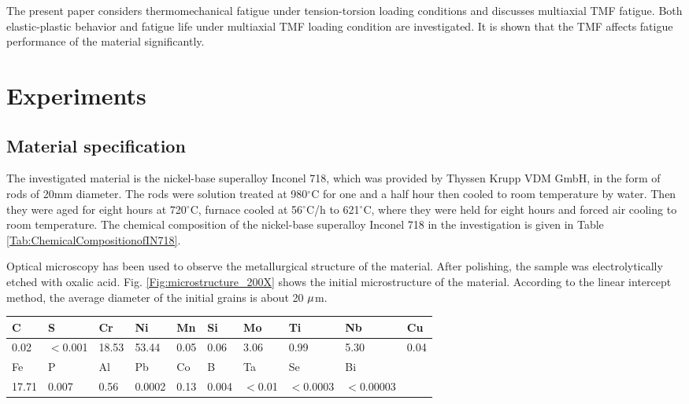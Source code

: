 \documentclass[preprint,5p,twocolumn,11pt,sort&compress]{elsarticle}
\begin{document}
The present paper considers thermomechanical fatigue under tension-torsion loading conditions and discusses multiaxial TMF fatigue. Both elastic-plastic behavior and fatigue life under multiaxial TMF loading condition are investigated. It is shown that the TMF affects fatigue performance of the material significantly.

\section{Experiments}
\subsection{Material specification}
The investigated material is the nickel-base superalloy Inconel 718, which was provided by Thyssen Krupp VDM GmbH, in the form of rods of 20mm diameter.
The rods were solution treated at 980$^{\circ}$C for one and a half hour then cooled to room temperature by water.
Then they were aged for eight hours at 720$^{\circ}$C, furnace cooled at 56$^{\circ}$C/h to 621$^{\circ}$C, where they were held for eight hours and forced air cooling to room temperature.
The chemical composition of the nickel-base superalloy Inconel 718 in the investigation is given in Table \ref{Tab:ChemicalCompositionofIN718}.

Optical microscopy has been used to observe the metallurgical structure of the material. After polishing, the sample was electrolytically etched with oxalic acid. Fig. \ref{Fig:microstructure_200X} shows the initial microstructure of the material. According to the linear intercept method, the average diameter of the initial grains is about 20 $\rm{\mu }$m.

\begin{table*}[htbp]
  \centering
  \caption{Chemical composition of Inconel 718 (wt. \%) in the present work}\vspace{0.1cm}
    \begin{tabular}{llllllllll}
    \hline
    C     & S     & Cr    & Ni    & Mn    & Si    & Mo    & Ti    & Nb    & Cu \\
    \hline
    0.02  & $<$0.001 & 18.53 & 53.44 & 0.05  & 0.06  & 3.06  & 0.99  & 5.30  & 0.04 \\
    \hline
    Fe    & P     & Al    & Pb    & Co    & B     & Ta    & Se    & Bi    &  \\
    \hline
    17.71 & 0.007 & 0.56  & 0.0002 & 0.13  & 0.004 & $<$0.01 & $<$0.0003 & $<$0.00003 &  \\
    \hline
    \end{tabular}%
  \label{Tab:ChemicalCompositionofIN718}%
\end{table*}%
\end{document}
